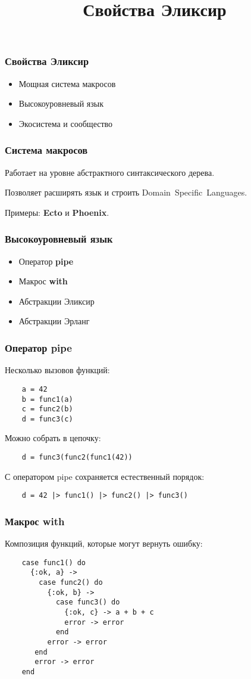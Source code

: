 \documentclass[10pt,xcolor=x11names]{beamer}
\title{Свойства Эликсир}
\begin{document}
\begin{frame}
  \frametitle{Свойства Эликсир}
  \begin{itemize}
  \item Мощная система макросов
  \item Высокоуровневый язык
  \item Экосистема и сообщество
  \end{itemize}
\end{frame}

\begin{frame}
  \frametitle{Система макросов}
  Работает на уровне абстрактного синтаксического дерева.
  \par \bigskip
  Позволяет расширять язык и строить Domain~Specific~Languages.
  \par \bigskip
  Примеры: \textbf{Ecto} и \textbf{Phoenix}.
\end{frame}

\begin{frame}
  \frametitle{Высокоуровневый язык}
  \begin{itemize}
  \item Оператор \textbf{pipe}
  \item Макрос \textbf{with}
  \item Абстракции Эликсир
  \item Абстракции Эрланг
  \end{itemize}  
\end{frame}


\begin{frame}[fragile]
  \frametitle{Оператор pipe}
  Несколько вызовов функций:
  \begin{lstlisting}
    a = 42
    b = func1(a)
    c = func2(b)
    d = func3(c)
  \end{lstlisting}
  Можно собрать в цепочку:
  \begin{lstlisting}
    d = func3(func2(func1(42))
  \end{lstlisting}
  С оператором pipe сохраняется естественный порядок:
  \begin{lstlisting}
    d = 42 |> func1() |> func2() |> func3()
  \end{lstlisting}
\end{frame}

\begin{frame}[fragile]
  \frametitle{Макрос with}
  Композиция функций, которые могут вернуть ошибку:
  \begin{lstlisting}
    case func1() do
      {:ok, a} -> 
        case func2() do
          {:ok, b} -> 
            case func3() do
              {:ok, c} -> a + b + c
              error -> error
            end
          error -> error
       end
       error -> error
    end
  \end{lstlisting}
\end{frame}
\end{document}
